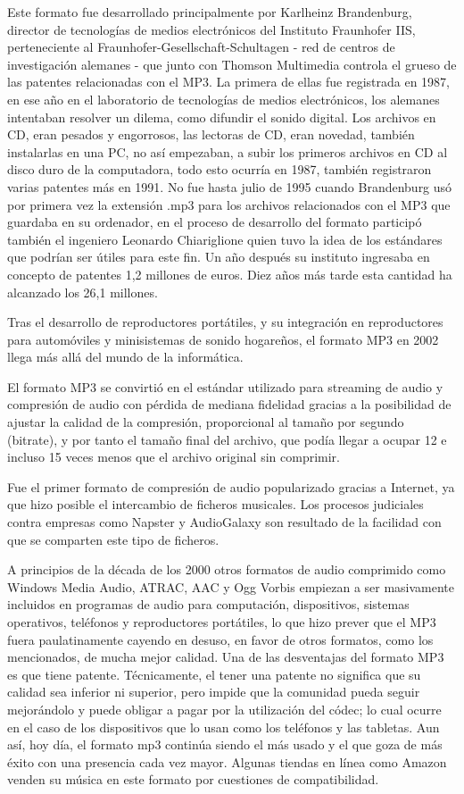 \documentclass[a4paper,11pt,oneside]{book}
\begin{document}
Este formato fue desarrollado principalmente por Karlheinz Brandenburg, director de tecnologías de medios electrónicos del Instituto Fraunhofer IIS, perteneciente al Fraunhofer-Gesellschaft-Schultagen - red de centros de investigación alemanes - que junto con Thomson Multimedia controla el grueso de las patentes relacionadas con el MP3.
La primera de ellas fue registrada en 1987, en ese año en el laboratorio de tecnologías de medios electrónicos, los alemanes intentaban resolver un dilema, como difundir el sonido digital.
Los archivos en CD, eran pesados y engorrosos, las lectoras de CD, eran novedad, también instalarlas en una PC, no así empezaban, a subir los primeros archivos en CD al disco duro de la computadora, todo esto ocurría en 1987, también registraron varias patentes más en 1991.
No fue hasta julio de 1995 cuando Brandenburg usó por primera vez la extensión .mp3 para los archivos relacionados con el MP3 que guardaba en su ordenador, en el proceso de desarrollo del formato participó también el ingeniero Leonardo Chiariglione quien tuvo la idea de los estándares que podrían ser útiles para este fin.
Un año después su instituto ingresaba en concepto de patentes 1,2 millones de euros. Diez años más tarde esta cantidad ha alcanzado los 26,1 millones.

Tras el desarrollo de reproductores portátiles, y su integración en reproductores para automóviles y minisistemas de sonido hogareños, el formato MP3 en 2002 llega más allá del mundo de la informática.

El formato MP3 se convirtió en el estándar utilizado para streaming de audio y compresión de audio con pérdida de mediana fidelidad gracias a la posibilidad de ajustar la calidad de la compresión, proporcional al tamaño por segundo (bitrate), y por tanto el tamaño final del archivo, que podía llegar a ocupar 12 e incluso 15 veces menos que el archivo original sin comprimir.

Fue el primer formato de compresión de audio popularizado gracias a Internet, ya que hizo posible el intercambio de ficheros musicales. Los procesos judiciales contra empresas como Napster y AudioGalaxy son resultado de la facilidad con que se comparten este tipo de ficheros.

A principios de la década de los 2000 otros formatos de audio comprimido como Windows Media Audio, ATRAC, AAC y Ogg Vorbis empiezan a ser masivamente incluidos en programas de audio para computación, dispositivos, sistemas operativos, teléfonos y reproductores portátiles, lo que hizo prever que el MP3 fuera paulatinamente cayendo en desuso, en favor de otros formatos, como los mencionados, de mucha mejor calidad. Una de las desventajas del formato MP3 es que tiene patente. Técnicamente, el tener una patente no significa que su calidad sea inferior ni superior, pero impide que la comunidad pueda seguir mejorándolo y puede obligar a pagar por la utilización del códec; lo cual ocurre en el caso de los dispositivos que lo usan como los teléfonos y las tabletas. Aun así, hoy día, el formato mp3 continúa siendo el más usado y el que goza de más éxito con una presencia cada vez mayor. Algunas tiendas en línea como Amazon venden su música en este formato por cuestiones de compatibilidad.
\end{document}
